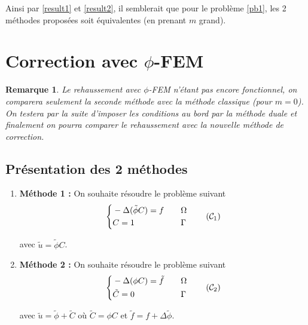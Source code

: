 \documentclass[french]{article}
\newtheorem*{Rem}{Remarque}
\begin{document}
	Ainsi par \ref{result1} et \ref{result2}, il semblerait que pour le problème \ref{pb1}, les 2 méthodes proposées soit équivalentes (en prenant $m$ grand).


	\setcounter{equation}{0}

	\section{Correction avec $\phi$-FEM}
	
	\begin{Rem}
		Le rehaussement avec $\phi$-FEM n'étant pas encore fonctionnel, on comparera seulement la seconde méthode avec la méthode classique (pour $m=0$). On testera par la suite d'imposer les conditions au bord par la méthode duale et finalement on pourra comparer le rehaussement avec la nouvelle méthode de correction.
	\end{Rem}
	
	
	\subsection{Présentation des 2 méthodes}
	
	\begin{enumerate}[label=\textbullet]
		\item \textbf{Méthode 1 : }
		On souhaite résoudre le problème suivant
		\begin{equation}
			\label{pbc1_phifem}
			\left\{\begin{aligned}
				&-\Delta (\tilde{\phi}C)=f \quad &&\Omega \\
				&C=1 \quad &&\Gamma
			\end{aligned}\right. \tag{$\mathcal{C}_1$}
		\end{equation}
		
		avec $\tilde{u}=\tilde{\phi}C$.
		
		\item \textbf{Méthode 2 : } On souhaite résoudre le problème suivant
		\begin{equation}
			\label{pbc2_phifem}
			\left\{\begin{aligned}
				&-\Delta(\phi C)=\tilde{f} \quad &&\Omega \\
				&\tilde{C}=0 \quad &&\Gamma
			\end{aligned}\right. \tag{$\mathcal{C}_2$}
		\end{equation}
		
		avec $\tilde{u}=\tilde{\phi}+\tilde{C}$ où $\tilde{C}=\phi C$ et $\tilde{f}=f+\Delta\tilde{\phi}$.
	\end{enumerate}
	
\end{document}
